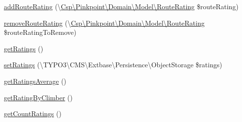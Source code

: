 \begin{DoxyCompactItemize}
\hyperlink{classCsp_1_1Pinkpoint_1_1Domain_1_1Model_1_1Route_a66acf7cd18d9830115f08dc36b91ee48}{add\+Route\+Rating} (\textbackslash{}\hyperlink{classCsp_1_1Pinkpoint_1_1Domain_1_1Model_1_1RouteRating}{Csp\textbackslash{}\+Pinkpoint\textbackslash{}\+Domain\textbackslash{}\+Model\textbackslash{}\+Route\+Rating} \$route\+Rating)
\item 
\hyperlink{classCsp_1_1Pinkpoint_1_1Domain_1_1Model_1_1Route_ad3cf96424734ce37a8d2fd0d41139c74}{remove\+Route\+Rating} (\textbackslash{}\hyperlink{classCsp_1_1Pinkpoint_1_1Domain_1_1Model_1_1RouteRating}{Csp\textbackslash{}\+Pinkpoint\textbackslash{}\+Domain\textbackslash{}\+Model\textbackslash{}\+Route\+Rating} \$route\+Rating\+To\+Remove)
\item 
\hyperlink{classCsp_1_1Pinkpoint_1_1Domain_1_1Model_1_1Route_a18680242c9156a3981700391fbbc5123}{get\+Ratings} ()
\item 
\hyperlink{classCsp_1_1Pinkpoint_1_1Domain_1_1Model_1_1Route_a033d5b492518a738925fe82ffdaaed46}{set\+Ratings} (\textbackslash{}T\+Y\+P\+O3\textbackslash{}\+C\+M\+S\textbackslash{}\+Extbase\textbackslash{}\+Persistence\textbackslash{}\+Object\+Storage \$ratings)
\item 
\hyperlink{classCsp_1_1Pinkpoint_1_1Domain_1_1Model_1_1Route_a9a109aa4b0fa006d094b76eda0bc645a}{get\+Ratings\+Average} ()
\item 
\hyperlink{classCsp_1_1Pinkpoint_1_1Domain_1_1Model_1_1Route_abb50caa76c9e71e0043c90dd58ee7c2b}{get\+Rating\+By\+Climber} ()
\item 
\hyperlink{classCsp_1_1Pinkpoint_1_1Domain_1_1Model_1_1Route_ae7c857cb4b9ba0404a4d4c3763f67fee}{get\+Count\+Ratings} ()
\end{DoxyCompactItemize}
